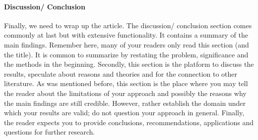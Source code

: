 \documentclass[justified, notoc]{tufte-book} %
\begin{document}
\paragraph{Discussion/ Conclusion}
Finally, we need to wrap up the article.%
The discussion/ conclusion section comes commonly at last but with extensive functionality. It contains a summary of the main findings. Remember here, many of your readers only read this section (and the title). It is common to summarize by restating the problem, significance and the methods in the beginning. Secondly, this section is the platform to discuss the results, speculate about reasons and theories and for the connection to other literature.
As was mentioned before, this section is the place where you may tell the reader about the limitations of your approach and possibly the reasons why the main findings are still credible. However, rather establish the domain under which your results are valid; do not question your approach in general. Finally, the reader expects you to provide conclusions, recommendations, applications and questions for further research.\\
\end{document}
